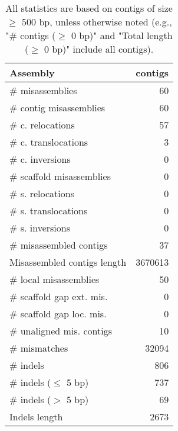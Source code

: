 \documentclass[12pt,a4paper]{article}
\begin{document}
\begin{table}[ht]
\begin{center}
\caption{All statistics are based on contigs of size $\geq$ 500 bp, unless otherwise noted (e.g., "\# contigs ($\geq$ 0 bp)" and "Total length ($\geq$ 0 bp)" include all contigs).}
\begin{tabular}{|l*{1}{|r}|}
\hline
Assembly & contigs \\ \hline
\# misassemblies & 60 \\ \hline
\hspace{2mm}\# contig misassemblies & 60 \\ \hline
\hspace{5mm}\# c. relocations & 57 \\ \hline
\hspace{5mm}\# c. translocations & 3 \\ \hline
\hspace{5mm}\# c. inversions & 0 \\ \hline
\hspace{2mm}\# scaffold misassemblies & 0 \\ \hline
\hspace{5mm}\# s. relocations & 0 \\ \hline
\hspace{5mm}\# s. translocations & 0 \\ \hline
\hspace{5mm}\# s. inversions & 0 \\ \hline
\# misassembled contigs & 37 \\ \hline
Misassembled contigs length & 3670613 \\ \hline
\# local misassemblies & 50 \\ \hline
\# scaffold gap ext. mis. & 0 \\ \hline
\# scaffold gap loc. mis. & 0 \\ \hline
\# unaligned mis. contigs & 10 \\ \hline
\# mismatches & 32094 \\ \hline
\# indels & 806 \\ \hline
\hspace{5mm}\# indels ($\leq$ 5 bp) & 737 \\ \hline
\hspace{5mm}\# indels ($>$ 5 bp) & 69 \\ \hline
Indels length & 2673 \\ \hline
\end{tabular}
\end{center}
\end{table}
\end{document}
